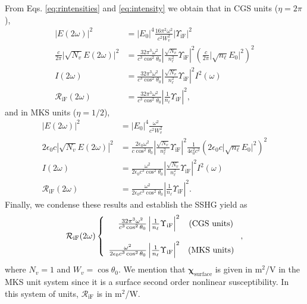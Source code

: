 \documentclass[aps,prb,10pt,showpacs,letterpaper,twocolumn]{revtex4-1}
\begin{document}
From Eqs. \eqref{eq:rintensities} and \eqref{eq:intensity} we obtain that in CGS
units ($\eta = 2\pi$),
\begin{align}\label{eq:r01}
\vert E(2\omega)\vert^{2} &=
\vert E_{0}\vert^{4}\frac{16\pi^{2}\omega^{2}}{c^{2}W^2_{v}}
\vert\Upsilon_{\mathrm{iF}}\vert^{2}\nonumber\\
\frac{c}{2\pi}\vert\sqrt{N_{v}}E(2\omega)\vert^{2} &=
\frac{32\pi^{3}\omega^{2}}{c^{3}\cos^2\theta_{0}}
\left\vert\frac{\sqrt{N_{v}}}{n^{2}_{\ell}}\Upsilon_{\mathrm{iF}}\right\vert^{2} 
\left(\frac{c}{2\pi}\vert\sqrt{n_{\ell}}E_{0}\vert^{2}\right)^{2}\nonumber\\ 
I(2\omega) &=
\frac{32\pi^{3}\omega^{2}}{c^{3}\cos^2\theta_{0}}
\left\vert\frac{\sqrt{N_{v}}}{n^{2}_{\ell}}\Upsilon_{\mathrm{iF}}\right\vert^{2}
I^{2}(\omega)\nonumber\\
\mathcal{R}_{\mathrm{iF}}(2\omega) &=
\frac{32\pi^{3}\omega^{2}}{c^{3}\cos^2\theta_{0}}
\left\vert\frac{1}{n_{\ell}}\Upsilon_{\mathrm{iF}}\right\vert^{2},
\end{align} 
and in MKS units ($\eta=1/2$),
\begin{align}\label{r01m}
\vert E(2\omega)\vert^{2} &=
\vert E_{0}\vert^{4}\frac{\omega^{2}}{c^{2}W^{2}_{v}}\nonumber\\
2\epsilon_{0}c|\sqrt{N_{v}}E(2\omega)|^{2} &=
\frac{2\epsilon_{0}\omega^{2}}{c\cos^{2}\theta_{0}}
\left\vert\frac{\sqrt{N_{v}}}{n^{2}_{\ell}}\Upsilon_{\mathrm{iF}}\right\vert^{2} 
\frac{1}{4\epsilon^{2}_0c^{2}}
\left(2\epsilon_{0}c\vert\sqrt{n_{\ell}}E_{0}\vert^{2}\right)^{2}\nonumber\\
I(2\omega) &= 
\frac{\omega^{2}}{2\epsilon_{0}c^3\cos^{2}\theta_{0}}
\left\vert\frac{\sqrt{N_{v}}}{n^{2}_{\ell}}\Upsilon_{\mathrm{iF}}\right\vert^{2}
I^{2}(\omega)\nonumber\\
\mathcal{R}_{\mathrm{iF}}(2\omega) &=
\frac{\omega^{2}}{2\epsilon_{0}c^3\cos^{2}\theta_{0}}
\left\vert  \frac{1}{n_{\ell}}\Upsilon_{\mathrm{iF}}\right\vert^{2}.
\end{align}
Finally, we condense these results and establish the SSHG yield as
\begin{equation}\label{eq:mc6}
\mathcal{R}_{\mathrm{iF}}(2\omega) 
\left\{
\begin{array}{ r c } 
\frac{32\pi^{3}\omega^{2}}{c^{3}\cos^{2}\theta_{0}}
\left\vert\frac{1}{n_{\ell}}\Upsilon_{\mathrm{iF}}\right\vert^{2} 
& \text{(CGS units)} \\\\
\frac{\omega^{2}}{2\epsilon_{0}c^3\cos^{2}\theta_{0}}
\left\vert\frac{1}{n_{\ell}}\Upsilon_{\mathrm{iF}}\right\vert^{2} 
& \text{(MKS units)} 
\end{array}
\right.,
\end{equation}
where $N_{v} = 1$ and $W_{v} = \cos\theta_{0}$. We mention that
$\boldsymbol{\chi}_{\mathrm{surface}}$ is given in m$^{2}$/V in the MKS unit
system since it is a surface second order nonlinear susceptibility. In this
system of units, $\mathcal{R}_{\mathrm{iF}}$ is in m$^{2}$/W.
\end{document}
